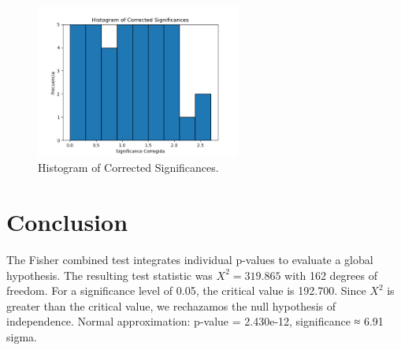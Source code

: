 \documentclass[12pt]{article}
\begin{document}
\begin{figure}[h!]
\centering
\includegraphics[width=0.6\textwidth]{corrected_significance_hist.png}
\caption{Histogram of Corrected Significances.}
\end{figure}

\section*{Conclusion}
The Fisher combined test integrates individual p-values to evaluate a global hypothesis.
The resulting test statistic was $X^2 = 319.865$ with 162 degrees of freedom.
For a significance level of 0.05, the critical value is 192.700.
Since $X^2$ is greater than the critical value, we rechazamos the null hypothesis of independence.
Normal approximation: p-value = 2.430e-12, significance ≈ 6.91 sigma.
\end{document}

